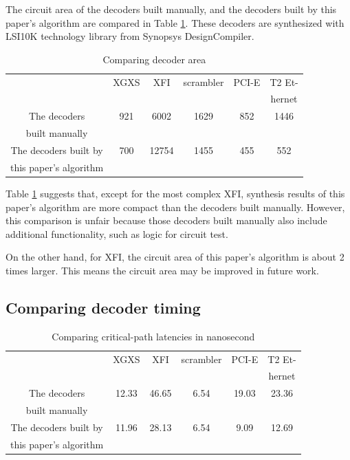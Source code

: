 \documentclass[journal]{IEEEtran}
\begin{document}
The circuit area of the decoders built manually,
and the decoders built by this paper's algorithm are compared in Table \ref{tab_cmparea}.
These decoders are synthesized with LSI10K technology library from Synopsys DesignCompiler.

\begin{table}[t]
\centering
\caption{Comparing decoder area}
\begin{tabular}{|c|c|c|c|c|c|}
\hline
                   &XGXS      &XFI       &scrambler    &PCI-E  &T2 Et-\\
&&&&&hernet\\ \hline
The decoders       &921       &6002      &1629         &852   &1446          \\
built manually           &&&&&\\ \hline
The decoders built by      &700       &12754     &1455         &455   &552          \\
this paper's algorithm   &&&&&\\ \hline
\end{tabular}\label{tab_cmparea}
\end{table}

Table \ref{tab_cmparea} suggests that,
except for the most complex XFI, synthesis results of this paper's algorithm
are more compact than the decoders built manually. However,
this comparison is unfair because those decoders built manually also include additional functionality,
such as logic for circuit test.

On the other hand,
for XFI,
the circuit area of this paper's algorithm is about 2 times larger.
This means the circuit area may be improved in future work.


\subsection{Comparing decoder timing}\label{subsec_timing}

\begin{table}[b]
\centering
\caption{Comparing critical-path latencies in nanosecond}
\begin{tabular}{|c|c|c|c|c|c|}
\hline
                   &XGXS        &XFI       &scrambler    &PCI-E   &T2 Et-\\
&&&&&hernet\\ \hline
The decoders       &12.33       &46.65     &6.54         &19.03  &23.36          \\
built manually           &&&&&\\ \hline
The decoders built by      &11.96       &28.13     &6.54         &9.09   &12.69          \\
this paper's algorithm   &&&&&\\ \hline
\end{tabular}\label{tab_cmptiming}
\end{table}
\end{document}
